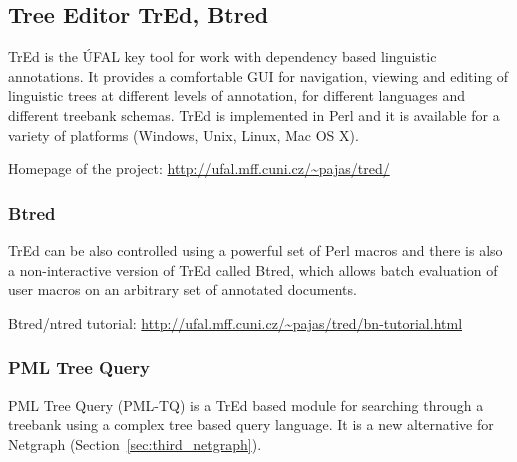 %

\subsection{Tree Editor TrEd, Btred} \label{sec:third_tred}

TrEd is the ÚFAL key tool for work with dependency based linguistic annotations. It provides a comfortable GUI for navigation, viewing and editing of linguistic trees at different levels of annotation, for different languages and different treebank schemas. TrEd is implemented in Perl and it is available for a variety of platforms (Windows, Unix, Linux, Mac OS X).

\medskip
Homepage of the project: \url{http://ufal.mff.cuni.cz/~pajas/tred/}


\subsubsection{Btred}
TrEd can be also controlled using a powerful set of Perl macros and there is also a non-interactive version of TrEd called Btred, which allows batch evaluation of user macros on an arbitrary set of annotated documents.

\medskip
Btred/ntred tutorial: \url{http://ufal.mff.cuni.cz/~pajas/tred/bn-tutorial.html}


\subsubsection{PML Tree Query} \label{sec:third_pml_tree_query}
PML Tree Query (PML-TQ) \citep{biblio:PaStSystemfor2009} is a TrEd based module for searching through a treebank using a complex tree based query language. It is a new alternative for Netgraph (Section~\ref{sec:third_netgraph}).

